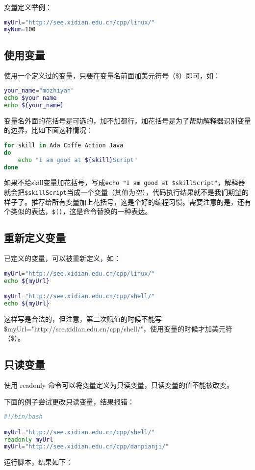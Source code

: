 变量定义举例：
\begin{lstlisting}[language=sh]
myUrl="http://see.xidian.edu.cn/cpp/linux/"
myNum=100
\end{lstlisting}


\subsection{使用变量}
使用一个定义过的变量，只要在变量名前面加美元符号（\$）即可，如：
\begin{lstlisting}[language=sh]
your_name="mozhiyan"
echo $your_name
echo ${your_name}
\end{lstlisting}
变量名外面的花括号是可选的，加不加都行，加花括号是为了帮助解释器识别变量的边界，比如下面这种情况：
\begin{lstlisting}[language=sh]
for skill in Ada Coffe Action Java 
do
    echo "I am good at ${skill}Script"
done
\end{lstlisting}
如果不给skill变量加花括号，写成\verb|echo "I am good at $skillScript"|，解释器就会把\verb|$skillScript|当成一个变量（其值为空），代码执行结果就不是我们期望的样子了。推荐给所有变量加上花括号，这是个好的编程习惯。需要注意的是，还有个类似的表达，\verb|$()|，这是命令替换的一种表达。


\subsection{重新定义变量}
已定义的变量，可以被重新定义，如：
\begin{lstlisting}[language=sh]
myUrl="http://see.xidian.edu.cn/cpp/linux/"
echo ${myUrl}

myUrl="http://see.xidian.edu.cn/cpp/shell/"
echo ${myUrl}
\end{lstlisting}
这样写是合法的，但注意，第二次赋值的时候不能写 \$myUrl="http://see.xidian.edu.cn/cpp/shell/"，使用变量的时候才加美元符（\$）。


\subsection{只读变量}
使用 readonly 命令可以将变量定义为只读变量，只读变量的值不能被改变。

下面的例子尝试更改只读变量，结果报错：
\begin{lstlisting}[language=sh]
#!/bin/bash

myUrl="http://see.xidian.edu.cn/cpp/shell/"
readonly myUrl
myUrl="http://see.xidian.edu.cn/cpp/danpianji/"
\end{lstlisting}
运行脚本，结果如下：

